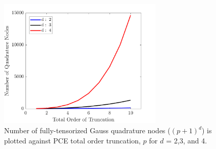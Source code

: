 \begin{figure}[htbp]
 \begin{center}
  \includegraphics[width=0.70\textwidth]{./Figures/quad_comp}
\caption{Number of fully-tensorized Gauss quadrature nodes ($(p+1)^d$) is plotted against PCE total order truncation, $p$ for $d$ = 2,3, and 4.}
\label{fig:curse}
\end{center}
\end{figure}




